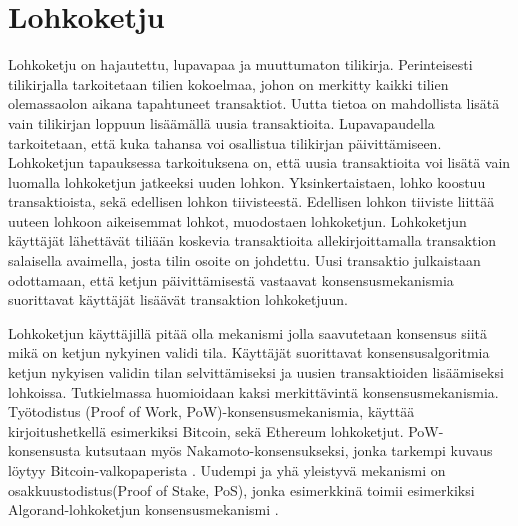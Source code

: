 
\section{Lohkoketju}

Lohkoketju on hajautettu, lupavapaa ja muuttumaton tilikirja. Perinteisesti tilikirjalla tarkoitetaan tilien kokoelmaa, johon on merkitty kaikki tilien olemassaolon aikana tapahtuneet transaktiot. Uutta tietoa on mahdollista lisätä vain tilikirjan loppuun lisäämällä uusia transaktioita. Lupavapaudella tarkoitetaan, että kuka tahansa voi osallistua tilikirjan päivittämiseen. Lohkoketjun tapauksessa tarkoituksena on, että uusia  transaktioita voi lisätä vain luomalla lohkoketjun jatkeeksi uuden lohkon. Yksinkertaistaen, lohko koostuu transaktioista, sekä edellisen lohkon tiivisteestä. Edellisen lohkon tiiviste liittää uuteen lohkoon aikeisemmat lohkot, muodostaen lohkoketjun. Lohkoketjun käyttäjät lähettävät tiliään koskevia transaktioita allekirjoittamalla transaktion salaisella avaimella, josta tilin osoite on johdettu. Uusi transaktio julkaistaan odottamaan, että ketjun päivittämisestä vastaavat konsensusmekanismia suorittavat käyttäjät lisäävät transaktion lohkoketjuun.

Lohkoketjun käyttäjillä pitää olla mekanismi jolla saavutetaan konsensus siitä mikä on ketjun nykyinen validi tila. Käyttäjät suorittavat konsensusalgoritmia ketjun nykyisen validin tilan selvittämiseksi ja uusien transaktioiden lisäämiseksi lohkoissa. Tutkielmassa huomioidaan kaksi merkittävintä konsensusmekanismia. Työtodistus (Proof of Work, PoW)-konsensusmekanismia, käyttää kirjoitushetkellä esimerkiksi Bitcoin, sekä Ethereum lohkoketjut. PoW-konsensusta kutsutaan myös Nakamoto-konsensukseksi, jonka tarkempi kuvaus löytyy Bitcoin-valkopaperista \cite{Nakamoto_bitcoin}. Uudempi ja yhä yleistyvä mekanismi on  osakkuustodistus(Proof of Stake, PoS), jonka esimerkkinä toimii esimerkiksi Algorand-lohkoketjun konsensusmekanismi \cite{gilad_algorand_2017}. 

